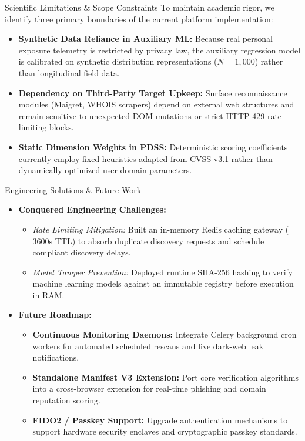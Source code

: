 \documentclass[aspectratio=169,10pt]{beamer}
\begin{document}
\begin{frame}{Scientific Limitations \& Scope Constraints}
  \normalsize
  To maintain academic rigor, we identify three primary boundaries of the current platform implementation:
  
  \vspace{0.25cm}
  \begin{itemize}\setlength{\itemsep}{0.40cm}
    \item \textbf{Synthetic Data Reliance in Auxiliary ML:} Because real personal exposure telemetry is restricted by privacy law, the auxiliary regression model is calibrated on synthetic distribution representations ($N=1,000$) rather than longitudinal field data.
    \item \textbf{Dependency on Third-Party Target Upkeep:} Surface reconnaissance modules (Maigret, WHOIS scrapers) depend on external web structures and remain sensitive to unexpected DOM mutations or strict HTTP 429 rate-limiting blocks.
    \item \textbf{Static Dimension Weights in PDSS:} Deterministic scoring coefficients currently employ fixed heuristics adapted from CVSS v3.1 rather than dynamically optimized user domain parameters.
  \end{itemize}
\end{frame}

\begin{frame}{Engineering Solutions \& Future Work}
  \small
  \begin{itemize}\setlength{\itemsep}{0.28cm}
    \item \textbf{Conquered Engineering Challenges:}
      \begin{itemize}\setlength{\itemsep}{0.10cm}
        \item \scriptsize \textit{Rate Limiting Mitigation:} Built an in-memory Redis caching gateway ($3600\text{s}$ TTL) to absorb duplicate discovery requests and schedule compliant discovery delays.
        \item \scriptsize \textit{Model Tamper Prevention:} Deployed runtime SHA-256 hashing to verify machine learning models against an immutable registry before execution in RAM.
      \end{itemize}
    \item \textbf{Future Roadmap:}
      \begin{itemize}\setlength{\itemsep}{0.10cm}
        \item \scriptsize \textbf{Continuous Monitoring Daemons:} Integrate Celery background cron workers for automated scheduled rescans and live dark-web leak notifications.
        \item \scriptsize \textbf{Standalone Manifest V3 Extension:} Port core verification algorithms into a cross-browser extension for real-time phishing and domain reputation scoring.
        \item \textbf{FIDO2 / Passkey Support:} Upgrade authentication mechanisms to support hardware security enclaves and cryptographic passkey standards.
      \end{itemize}
  \end{itemize}
\end{frame}
\end{document}
